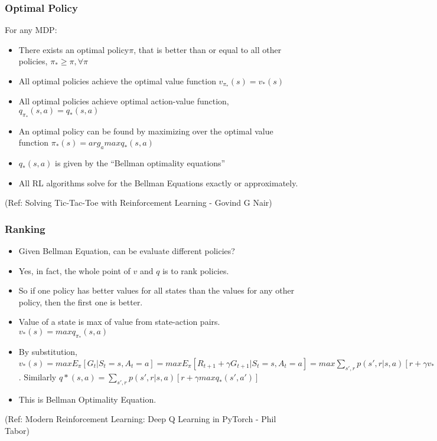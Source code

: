 \begin{frame}[fragile]\frametitle{Optimal Policy}

For any MDP:

\begin{itemize}
\item There exists an optimal policy$\pi$, that is better than or equal to all other policies, $\pi_* \geq \pi, \forall \pi$
\item All optimal policies achieve the optimal value function $v_{\pi_*}(s) = v_*(s)$
\item All optimal policies achieve optimal action-value function,  $q_{\pi_*}(s,a) = q_*(s,a)$
\item An optimal policy can be found by maximizing over the optimal value function $\pi_*(s) = arg_a max q_*(s,a)$
\item  $q_*(s,a)$ is given by the ``Bellman optimality equations''
\item All RL algorithms solve for the Bellman Equations exactly or approximately. 
\end{itemize}



{\tiny (Ref: Solving Tic-Tac-Toe with Reinforcement Learning - Govind G Nair)}

\end{frame}


\begin{frame}[fragile]\frametitle{Ranking}


\begin{itemize}
\item Given Bellman Equation, can be evaluate different policies?
\item Yes, in fact, the whole point of $v$ and $q$ is to rank policies.
\item So if one policy has better values for all states than the values for any other policy, then the first one is better.
\item Value of a state is max of value from state-action pairs. $v_*(s) = max q_{\pi_*}(s,a)$
\item By substitution, $v_*(s) = max E_{\pi}[G_t|S_t=s, A_t=a] = max E_{\pi}[R_{t+1}+ \gamma G_{t+1}|S_t=s, A_t=a] = max \sum_{s',r} p (s',r|s,a)[r + \gamma v_*(s')]$. Similarly $q*(s,a) = \sum_{s',r} p (s',r|s,a)[r + \gamma max q_*(s',a')]$
\item This is Bellman Optimality Equation.
\end{itemize}

{\tiny (Ref: Modern Reinforcement Learning: Deep Q Learning in PyTorch - Phil Tabor)}

\end{frame}

